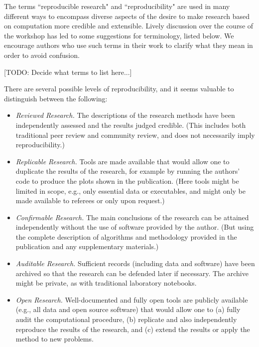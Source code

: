 \documentclass[11pt]{article}
\newcommand{\todo}[1]{{\color{red} [TODO: #1]}}
\newcommand{\todo}[1]{}
\begin{document}
The terms ``reproducible research" and ``reproducibility" are used in many
different ways to encompass diverse aspects of the desire to make research
based on computation more credible and extensible.  Lively discussion over
the course of the workshop has led to some suggestions for terminology,
listed below.  We encourage authors who use such
terms in their work to clarify what they mean in order to avoid confusion. 

\todo{Decide what terms to list here...}

There are several possible levels of reproducibility, and it seems valuable
to distinguish between the following:

\begin{itemize} 
\item {\em Reviewed Research.} The descriptions of the research methods have been
independently assessed and the results judged credible. (This includes both
traditional peer review and community review, and does not necessarily imply
reproducibility.)

\item {\em Replicable Research.}  Tools are made available that would allow one to
duplicate the results of the research, for example by running the authors'
code to produce the plots shown in the publication. (Here tools might be
limited in scope, e.g., only essential data or executables, and might only
be made available to referees or only upon request.)

\item {\em Confirmable Research.} The main conclusions of the research can be attained
independently without the use of software provided by the author. (But using
the complete description of algorithms and methodology provided in the
publication and any supplementary materials.)

\item {\em Auditable Research.}  Sufficient records (including data and software) have
been archived so that the research can be defended later if necessary.  The
archive might be private, as with traditional laboratory notebooks.

\item {\em Open Research.}  Well-documented and fully open tools are publicly available
(e.g., all data and open source software) that would allow one to (a) fully
audit the computational procedure, (b) replicate and also independently
reproduce the results of the research, and 
(c) extend the results or apply the method to new problems.

\end{itemize} 
\end{document}
